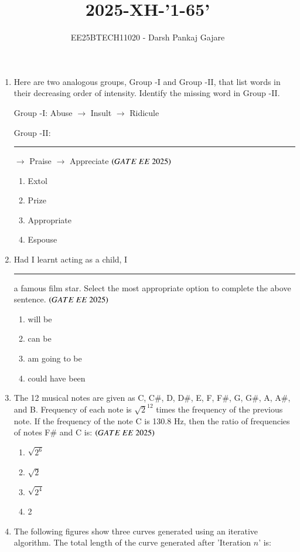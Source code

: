 \documentclass[journal,12pt,onecolumn]{IEEEtran}
\theoremstyle{remark}
\begin{document}
\title{2025-XH-'1-65'}
\author{EE25BTECH11020 - Darsh Pankaj Gajare}
\maketitle
\begin{enumerate}

  \item Here are two analogous groups, Group -I and Group -II, that list words in their decreasing order of intensity. Identify the missing word in Group -II.  

  Group -I: Abuse $\to$ Insult $\to$ Ridicule  

  Group -II: \rule{2cm}{0.15mm} $\to$ Praise $\to$ Appreciate  
\hfill $\brak{GATE\ EE\ 2025}$
  \begin{multicols}{4}
  \begin{enumerate}
    \item Extol
    \item Prize
    \item Appropriate
    \item Espouse
  \end{enumerate}
  \end{multicols}

  \item Had I learnt acting as a child, I \rule{2cm}{0.15mm} a famous film star. Select the most appropriate option to complete the above sentence.  
\hfill $\brak{GATE\ EE\ 2025}$
  \begin{multicols}{4}
  \begin{enumerate}
    \item will be
    \item can be
    \item am going to be
    \item could have been
  \end{enumerate}
  \end{multicols}

  \item The 12 musical notes are given as C, C\#, D, D\#, E, F, F\#, G, G\#, A, A\#, and B.  
  Frequency of each note is $\sqrt{2}^{12}$ times the frequency of the previous note.  
  If the frequency of the note C is 130.8 Hz, then the ratio of frequencies of notes F\# and C is:  
\hfill $\brak{GATE\ EE\ 2025}$
  \begin{multicols}{4}
  \begin{enumerate}
    \item $\sqrt{2^{6}}$
    \item $\sqrt{2}$
    \item $\sqrt{2^{4}}$
    \item 2
  \end{enumerate}
  \end{multicols}
  \item The following figures show three curves generated using an iterative algorithm.  
  The total length of the curve generated after 'Iteration $n$' is:  


\end{enumerate}
\end{document}
